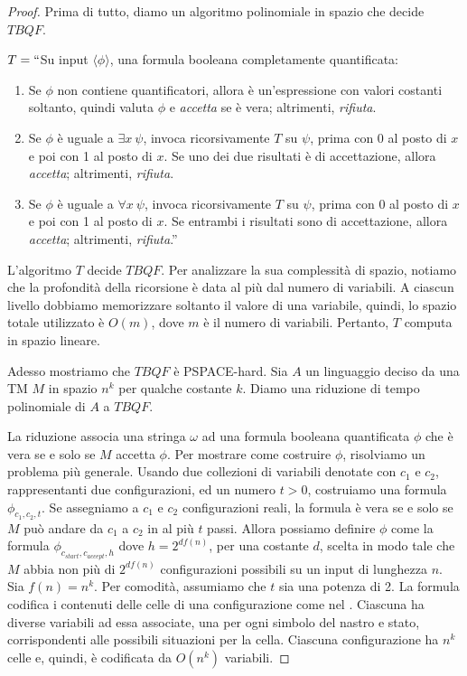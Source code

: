 \documentclass[12pt]{report}
\newcommand{\namerefl}[1]{%
	\bgroup
	\let\nmu\MakeLowercase
	\nameref{#1}\egroup}
\newcommand{\nmu}{}
\begin{document}
\begin{proof}
	Prima di tutto, diamo un algoritmo polinomiale in spazio che decide $TBQF$.

	$T = ``$Su input $\langle \phi \rangle$, una formula booleana completamente quantificata:
	\begin{enumerate}
		\item Se $\phi$ non contiene quantificatori, allora è un'espressione con valori costanti soltanto, quindi valuta $\phi$ e \textit{accetta} se è vera; altrimenti, \textit{rifiuta}.
		\item Se $\phi$ è uguale a $\exists x\ \psi$, invoca ricorsivamente $T$ su $\psi$, prima con 0 al posto di $x$ e poi con 1 al posto di $x$. Se uno dei due risultati è di accettazione, allora \textit{accetta}; altrimenti, \textit{rifiuta}.
		\item Se $\phi$ è uguale a $\forall x\ \psi$, invoca ricorsivamente $T$ su $\psi$, prima con 0 al posto di $x$ e poi con 1 al posto di $x$. Se entrambi i risultati sono di accettazione, allora \textit{accetta}; altrimenti, \textit{rifiuta}.''
	\end{enumerate}
	L'algoritmo $T$ decide $TBQF$. Per analizzare la sua complessità di spazio, notiamo che la profondità della ricorsione è data al più dal numero di variabili. A ciascun livello dobbiamo memorizzare soltanto il valore di una variabile, quindi, lo spazio totale utilizzato è $O(m)$, dove $m$ è il numero di variabili. Pertanto, $T$ computa in spazio lineare.

	Adesso mostriamo che $TBQF$ è PSPACE-hard. Sia $A$ un linguaggio deciso da una TM $M$ in spazio $n^k$ per qualche costante $k$. Diamo una riduzione di tempo polinomiale di $A$ a $TBQF$.

	La riduzione associa una stringa $\omega$ ad una formula booleana quantificata $\phi$ che è vera se e solo se $M$ accetta $\phi$. Per mostrare come costruire $\phi$, risolviamo un problema più generale. Usando due collezioni di variabili denotate con $c_1$ e $c_2$, rappresentanti due configurazioni, ed un numero $t > 0$, costruiamo una formula $\phi_{c_1, c_2, t}$. Se assegniamo a $c_1$ e $c_2$ configurazioni reali, la formula è vera se e solo se $M$ può andare da  $c_1$ a $c_2$ in al più $t$ passi. Allora possiamo definire $\phi$ come la formula $\phi_{c_{start}, c_{accept}, h}$ dove $h = 2^{df(n)}$, per una costante $d$, scelta in modo tale che $M$ abbia non più di $2^{df(n)}$ configurazioni possibili su un input di lunghezza $n$. Sia $f(n) = n^k$. Per comodità, assumiamo che $t$ sia una potenza di 2. La formula codifica i contenuti delle celle di una configurazione come nel \namerefl{th:cook_levin}. Ciascuna ha diverse variabili ad essa associate, una per ogni simbolo del nastro e stato, corrispondenti alle possibili situazioni per la cella. Ciascuna configurazione ha $n^k$ celle e, quindi, è codificata da $O\left(n^k\right)$ variabili.


\end{proof}
\end{document}
